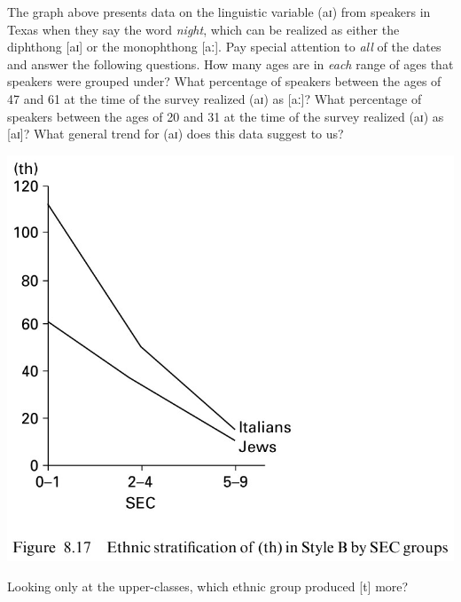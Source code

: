 \documentclass[addpoints]{exam}
\begin{document}
\begin{questions}
        The graph above presents data on the linguistic variable (aɪ) from speakers in Texas when they say the word \textit{night}, which can be realized as either the diphthong [aɪ] or the monophthong [aː]. Pay special attention to \emph{all} of the dates and answer the following questions.
        \question[1] How many ages are in \emph{each} range of ages that speakers were grouped under? \hrulefill
        \question[1] What percentage of speakers between the ages of 47 and 61 at the time of the survey realized (aɪ) as [aː]? \hrulefill
        \question[1] What percentage of speakers between the ages of 20 and 31 at the time of the survey realized (aɪ) as [aɪ]? \hrulefill
        \question[1] What general trend for (aɪ) does this data suggest to us? \hrulefill

        \hrulefill

        \hrulefill

        \parbox{0.5\linewidth}{
          \includegraphics[scale=0.75]{ny_ethnicity_th.jpg}
        }
        \parbox{0.5\linewidth}{
        }
        \question[1] Looking only at the upper-classes, which ethnic group produced [t] more? \hrulefill
        \begin{parts}

\end{parts}
\end{questions}
\end{document}
